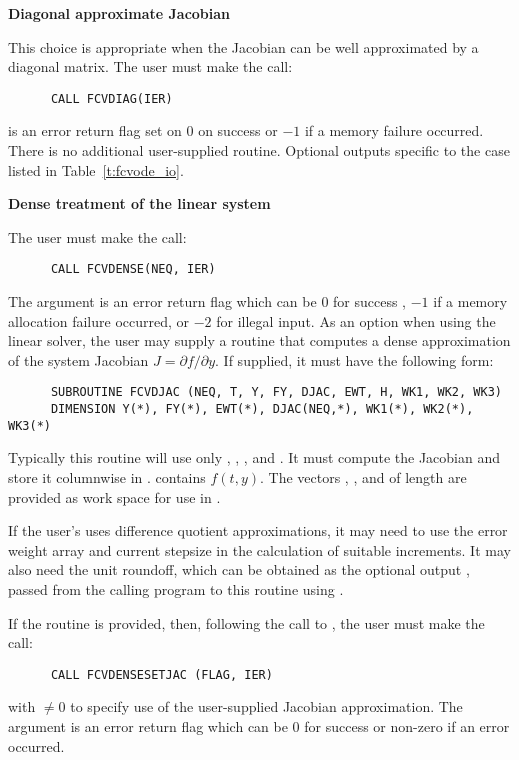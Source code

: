 \begin{Steps}
  {\s} {\bf Diagonal approximate Jacobian}
  
  This choice is appropriate when the Jacobian can be well approximated by
  a diagonal matrix.  The user must make the call:
\begin{verbatim}
      CALL FCVDIAG(IER)
\end{verbatim}
   is an error return flag set on $0$ on success or $-1$ if a memory 
  failure occurred.
  There is no additional user-supplied routine. Optional outputs specific
  to the {\diag} case listed in Table~\ref{t:fcvode_io}.
  
  {\s} {\bf Dense treatment of the linear system}
  
  The user must make the call:
\begin{verbatim}
      CALL FCVDENSE(NEQ, IER)
\end{verbatim}
  The argument  is an error return flag which can be $0$ 
  for success , $-1$ if a memory allocation failure occurred, or $-2$ for illegal
  input.  
  As an option when using the {\dense} linear solver, the user may supply a
  routine that computes a dense approximation of the system Jacobian 
  $J = \partial f / \partial y$. If supplied, it must have the following form:
\begin{verbatim}
      SUBROUTINE FCVDJAC (NEQ, T, Y, FY, DJAC, EWT, H, WK1, WK2, WK3)
      DIMENSION Y(*), FY(*), EWT(*), DJAC(NEQ,*), WK1(*), WK2(*), WK3(*)
\end{verbatim}
  Typically this routine will use only , , , and . 
  It must compute the Jacobian and store it columnwise in .
   contains $f(t,y)$. The vectors , , and 
  of length  are provided as work space for use in .
  
  If the user's  uses difference quotient approximations, it
  may need to use the error weight array  and current stepsize 
  in the calculation of suitable increments.  It may also need the unit
  roundoff, which can be obtained as the optional output ,
  passed from the calling program to this routine using .

  If the  routine is provided, then, 
  following the call to , the user must make the call:
\begin{verbatim}
      CALL FCVDENSESETJAC (FLAG, IER)
\end{verbatim}
  with  $\neq 0$ to specify use of the user-supplied Jacobian approximation.
  The argument  is an error return flag which can be $0$ 
  for success or non-zero if an error occurred.
  

\end{Steps}
